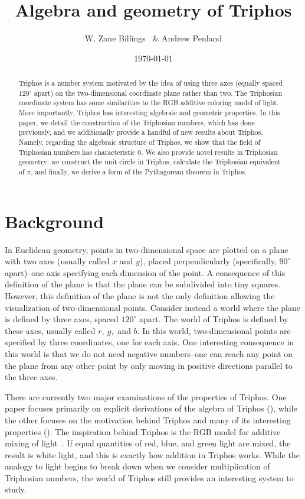 \documentclass{article}
\title{Algebra and geometry of Triphos}
\author{W. Zane Billings \  \& Andrew Penland}
\date{\today}
\theoremstyle{plain}
\theoremstyle{definition}
\newcommand{\degr}{^{\circ}}
\begin{document}
	\maketitle

	\begin{abstract}
		Triphos is a number system motivated by the idea of using three axes
		(equally spaced \(120^{\circ}\) apart) on the two-dimensional
		coordinate plane rather than two. The Triphosian coordinate system has
		some similarities to the RGB additive coloring model of light. More
		importantly, Triphos has interesting algebraic and geometric
		properties. In this paper, we detail the construction of the Triphosian
		numbers, which has done previously, and we additionally provide a
		handful of new results about Triphos. Namely, regarding the algebraic
		structure of Triphos, we show that the field of Triphosian numbers has
		characteristic 0. We also provide novel results in Triphosian geometry:
		we construct the unit circle in Triphos, calculate the Triphosian
		equivalent of \(\pi\), and finally, we derive a form of the Pythagorean
		theorem in Triphos.
	\end{abstract}

	\section{Background}

	In Euclidean geometry, points in two-dimensional space are plotted on a
	plane with two axes (usually called \(x\) and \(y\)), placed
	perpendicularly (specifically, \(90\degr\) apart)--one axis specifying each
	dimension of the point. A consequence of this definition of the plane is
	that the plane can be subdivided into tiny squares. However, this
	definition of the plane is not the only definition allowing the
	visualization of two-dimensional points. Consider instead a world where the
	plane is defined by three axes, spaced \(120\degr\) apart. The world of
	Triphos is defined by these axes, usually called \(r, \ g,\) and \(b\). In
	this world, two-dimensional points are specified by three coordinates, one
	for each axis. One interesting consequence in this world is that we do not
	need negative numbers--one can reach any point on the plane from any other
	point by only moving in positive directions parallel to the three axes.

	There are currently two major examinations of the properties of Triphos.
	One paper focuses primarily on explicit derivations of the algebra of
	Triphos (\cite{egging}), while the other focuses on the motivation behind
	Triphos and many of its interesting properties (\cite{grossnickle}). The
	inspiration behind Triphos is the RGB model for additive mixing of
	light~\cite{grossnickle}. If equal quantities of red, blue, and green light
	are mixed, the result is white light, and this is exactly how addition in
	Triphos works. While the analogy to light begins to break down when we
	consider multiplication of Triphosian numbers, the world of Triphos still
	provides an interesting system to study.
\end{document}
